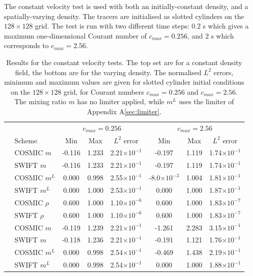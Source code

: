 \documentclass{ametsocV6.1}
\begin{document}
The constant velocity test is used with both an initially-constant density, and a spatially-varying density.
The tracers are initialised as slotted cylinders on the $128\times 128$ grid.
The test is run with two different time steps: $0.2$ s which gives a maximum one-dimensional Courant number of $c_{max}=0.256$, and $2$ s which corresponds to $c_{max}=2.56$.
\\
\begin{table}[h!]
\small
\begin{center}
\begin{tabular}{| c | l | c c c | c c c | } \hline
  & & \multicolumn{3}{c|}{$c_{max}=0.256$} & \multicolumn{3}{c|}{$c_{max}=2.56$} \\
  & Scheme &  Min & Max & $L^2$ error & Min & Max & $L^2$ error   \\ \hline
  \parbox[t]{2mm}{}
  & COSMIC $m$ & -0.116 & 1.233 & 2.21$\times 10^{-1}$ & -0.197 & 1.119 & 1.74$\times 10^{-1}$ \\
  & SWIFT $m$ & -0.116 & 1.233 & 2.21$\times 10^{-1}$ & -0.197 & 1.119 & 1.74$\times 10^{-1}$ \\
  & COSMIC $m^L$ & 0.000 & 0.998 & 2.55$\times 10^{-1}$ & -8.0$\times 10^{-3}$ & 1.004 & 1.81$\times 10^{-1}$ \\
  & SWIFT  $m^L$ & 0.000 & 1.000 & 2.53$\times 10^{-1}$ & 0.000 & 1.000 & 1.87$\times 10^{-1}$ \\ \hline
  \parbox[t]{2mm}{}
  & COSMIC $\rho$ & 0.600 & 1.000 & 1.10$\times 10^{-6}$ & 0.600 & 1.000 & 1.83$\times 10^{-7}$ \\
  & SWIFT $\rho$ & 0.600 & 1.000 & 1.10$\times 10^{-6}$ & 0.600 & 1.000 & 1.83$\times 10^{-7}$ \\
  & COSMIC $m$ & -0.119 & 1.239 & 2.21$\times 10^{-1}$ & -1.261 & 2.283 & 3.15$\times 10^{-1}$ \\
  & SWIFT $m$ & -0.118 & 1.236 & 2.21$\times 10^{-1}$ & -0.191 & 1.121 & 1.76$\times 10^{-1}$ \\
  & COSMIC $m^L$ & 0.000 & 0.998 & 2.54$\times 10^{-1}$ & -0.469 & 1.438 & 2.19$\times 10^{-1}$ \\
  & SWIFT $m^L$ & 0.000 & 0.998 & 2.54$\times 10^{-1}$ & 0.000 & 1.000 & 1.88$\times 10^{-1}$ \\ \hline
\end{tabular}
\caption{Results for the constant velocity tests. The top set are for a constant density field, the bottom are for the varying density. The normalised $L^2$ errors, minimum and maximum values are given for slotted cylinder initial conditions on the $128\times128$ grid, for Courant numbers $c_{max}=0.256$ and $c_{max}=2.56$.
The mixing ratio $m$ has no limiter applied, while $m^L$ uses the limiter of Appendix A\ref{sec:limiter}.}
\label{table:test1}
\end{center}
\end{table}
\end{document}
